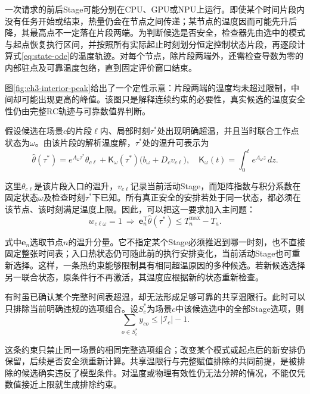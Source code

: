 一次请求的前后Stage可能分别在CPU、GPU或NPU上运行。即使某个时间片段内没有任务开始或结束，热量仍会在节点之间传递；某节点的温度因而可能先升后降，其最高点不一定落在片段两端。为判断候选是否安全，检查器先由选中的模式与起点恢复执行区间，并按照所有实际起止时刻划分恒定控制状态片段，再逐段计算式\eqref{eq:state-ode}的温度轨迹。对每个节点，除片段两端外，还需检查导数为零的内部驻点及可靠温度包络，直到固定评价窗口结束。

图\ref{fig:ch3-interior-peak}给出了一个定性示意：片段两端的温度均未超过限制，中间却可能出现更高的峰值。该图只是解释连续约束的必要性，真实候选的温度安全性仍由完整RC轨迹与可靠数值界判断。



假设候选在场景$c$的片段$\ell$内、局部时刻$\tau^*$处出现明确超温，并且当时联合工作点状态为$\omega$。由该片段的解析温度解，$\tau^*$处的温升可表示为
\begin{equation}
\widehat\theta(\tau^*)=
e^{A_\omega\tau^*}\theta_{c\ell}
+\mathsf K_\omega(\tau^*)\bigl(b_\omega+D_cv_{c\ell}\bigr),
\quad \mathsf K_\omega(t)=\int_0^t e^{A_\omega z}\,dz.
\label{eq:interior-temperature}
\end{equation}

这里$\theta_{c\ell}$是该片段入口的温升，$v_{c\ell}$记录当前活动Stage，而矩阵指数与积分系数在固定状态$\omega$及检查时刻$\tau^*$下已知。所有真正安全的安排若处于同一状态，都必须在该节点、该时刻满足温度上限。因此，可以把这一要求加入主问题：
\begin{equation}
w_{c\ell\omega}=1\ \Longrightarrow\
\mathbf e_n^{\mathsf T}\widehat\theta(\tau^*)
\le T_n^{\max}-T_a.
\label{eq:conditional-cut}
\end{equation}

式中$\mathbf e_n$选取节点$n$的温升分量。它不指定某个Stage必须推迟到哪一时刻，也不直接固定整张时间表；入口热状态仍可随此前的执行安排变化，当前活动Stage也可重新选择。这样，一条热约束能够限制具有相同超温原因的多种候选。若新候选选择另一联合状态，原条件行不再激活，其温度应根据新的状态重新检查。

有时虽已确认某个完整时间表超温，却无法形成足够可靠的共享温限行。此时可以只排除当前明确违规的选项组合。设$S_c^*$为场景$c$中该候选选中的全部Stage选项，则
\begin{equation}
\sum_{o\in S_c^*}y_{co}\le |\mathcal I_c|-1.
\label{eq:full-assignment-cut}
\end{equation}

这条约束只禁止同一场景的相同完整选项组合；改变某个模式或起点后的新安排仍保留，后续是否安全须重新计算。共享温限行与完整赋值排除的共同前提，是被排除的候选确实违反了模型条件。对温度或物理有效性仍无法分辨的情况，不能仅凭数值接近上限就生成排除约束。

